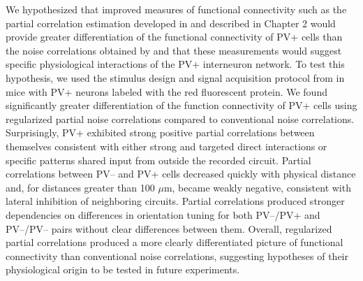 We hypothesized that improved measures of functional connectivity such as the partial correlation estimation developed in \cite{Yatsenko:2014} and described in Chapter 2 would provide greater differentiation of the functional connectivity of PV+ cells than the noise correlations obtained by \cite{Hofer:2011} and that these measurements would suggest specific physiological interactions of the PV+ interneuron network. 
To test this hypothesis, we used the stimulus design and signal acquisition protocol from \cite{Yatsenko:2014} in mice with PV+ neurons labeled with the red fluorescent protein. 
We found significantly greater differentiation of the function connectivity of PV+ cells using regularized partial noise correlations compared to conventional noise correlations.  Surprisingly, PV+ exhibited strong positive partial correlations between themselves consistent with either strong and targeted direct interactions or specific patterns shared input from outside the recorded circuit. Partial correlations between PV-- and PV+ cells decreased quickly with physical distance and, for distances greater than 100 $\mu$m, became weakly negative, consistent with lateral inhibition of neighboring circuits. Partial correlations produced stronger dependencies on differences in orientation tuning for both PV--/PV+ and PV--/PV-- pairs without clear differences between them. Overall, regularized partial correlations produced a more clearly differentiated picture of functional connectivity than conventional noise correlations, suggesting hypotheses of their physiological origin to be tested in future experiments.
